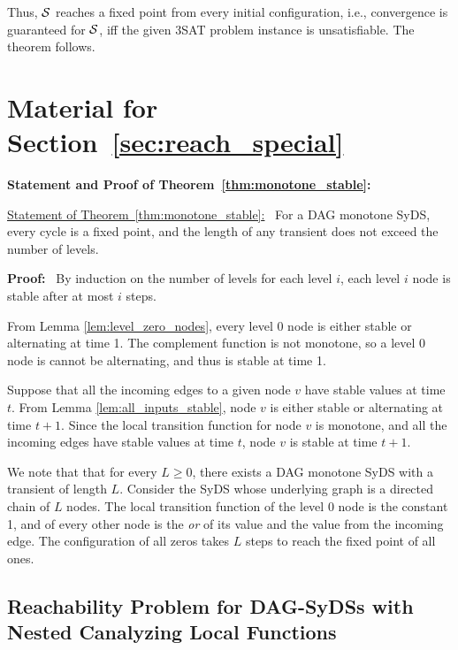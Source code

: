 \smallskip

Thus, $\mbox{$\mathcal{S}$}$ reaches a fixed point from every initial configuration, 
i.e.,  convergence is guaranteed for $\mbox{$\mathcal{S}$}$,
iff the given 3SAT problem instance is unsatisfiable.
The theorem follows.  \QED



\section{Material for Section~\ref{sec:reach_special}}

\medskip

\noindent
\textbf{Statement and Proof of Theorem~\ref{thm:monotone_stable}:}

\medskip

\noindent
\underline{Statement of Theorem~\ref{thm:monotone_stable}:}~
For a DAG monotone SyDS, every cycle is a fixed point, 
and the length of any transient does not exceed the number of levels.

\medskip

\noindent
\textbf{Proof:}~ 
By induction on the number of levels for each level $i$, 
each level $i$ node is stable after at most $i$ steps.

From Lemma \ref{lem:level_zero_nodes}, every level 0 node is either
stable or alternating  at time 1.  The complement function is not
monotone, so a  level 0 node is cannot be alternating, and thus is
stable at time 1.

Suppose that all the incoming edges to a given node $v$ have stable
values at time $t$.  From Lemma \ref{lem:all_inputs_stable}, node
$v$ is either stable or alternating  at time $t+1$.  Since the local
transition function for node $v$ is monotone, and all the incoming
edges have stable values at time $t$, node $v$ is stable at time
$t+1$. \QED

\medskip

We note that that for every $L \geq 0$, there exists a DAG
monotone SyDS with a transient of length $L$.  Consider the SyDS
whose underlying graph is a directed chain of $L$ nodes.  The local
transition function of the level 0 node is the constant 1, and of
every other node is the {\em or} of its value and the value from
the incoming edge.  The configuration of all zeros takes $L$ steps
to reach the fixed point of all ones.


\subsection{Reachability Problem for DAG-SyDSs with 
Nested Canalyzing Local Functions}
\label{asec:reach_ncf}

